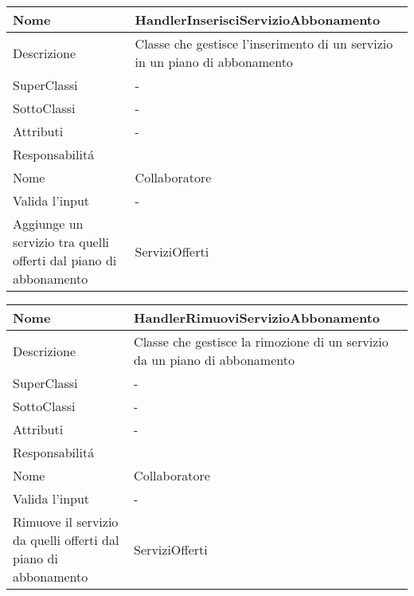 \begin{center}
    \begin{longtable}{ |p{3cm}|p{3cm}|p{3cm}|p{3cm}| }
        \hline
        Nome & \multicolumn{3}{|p{9cm}|}{HandlerInserisciServizioAbbonamento} \\\hline
        Descrizione & \multicolumn{3}{|p{9cm}|}{Classe che gestisce l'inserimento di un servizio in un piano di abbonamento} \\\hline
        SuperClassi & \multicolumn{3}{|p{9cm}|}{-} \\\hline
        SottoClassi & \multicolumn{3}{|p{9cm}|}{-} \\\hline
        Attributi & \multicolumn{3}{|p{9cm}|}{-} \\\hline
        \multicolumn{4}{|p{12cm}|}{Responsabilit\'a} \\\hline
        \multicolumn{2}{|p{6cm}|}{Nome} & \multicolumn{2}{|p{6cm}|}{Collaboratore} \\\hline
        \multicolumn{2}{|p{6cm}|}{Valida l'input} & \multicolumn{2}{|p{6cm}|}{-} \\\hline
        \multicolumn{2}{|p{6cm}|}{Aggiunge un servizio tra quelli offerti dal piano di abbonamento} & \multicolumn{2}{|p{6cm}|}{ServiziOfferti} \\\hline
    \end{longtable}
\end{center}

\begin{center}
    \begin{longtable}{ |p{3cm}|p{3cm}|p{3cm}|p{3cm}| }
        \hline
        Nome & \multicolumn{3}{|p{9cm}|}{HandlerRimuoviServizioAbbonamento} \\\hline
        Descrizione & \multicolumn{3}{|p{9cm}|}{Classe che gestisce la rimozione di un servizio da un piano di abbonamento} \\\hline
        SuperClassi & \multicolumn{3}{|p{9cm}|}{-} \\\hline
        SottoClassi & \multicolumn{3}{|p{9cm}|}{-} \\\hline
        Attributi & \multicolumn{3}{|p{9cm}|}{-} \\\hline
        \multicolumn{4}{|p{12cm}|}{Responsabilit\'a} \\\hline
        \multicolumn{2}{|p{6cm}|}{Nome} & \multicolumn{2}{|p{6cm}|}{Collaboratore} \\\hline
        \multicolumn{2}{|p{6cm}|}{Valida l'input} & \multicolumn{2}{|p{6cm}|}{-} \\\hline
        \multicolumn{2}{|p{6cm}|}{Rimuove il servizio da quelli offerti dal piano di abbonamento} & \multicolumn{2}{|p{6cm}|}{ServiziOfferti} \\\hline
    \end{longtable}
\end{center}


